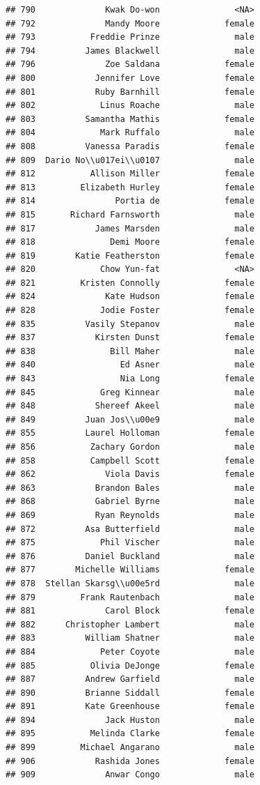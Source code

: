 \documentclass[
]{article}
\begin{document}
\begin{verbatim}
## 790              Kwak Do-won               <NA>
## 792              Mandy Moore             female
## 793           Freddie Prinze               male
## 794          James Blackwell               male
## 796              Zoe Saldana             female
## 800            Jennifer Love             female
## 801            Ruby Barnhill             female
## 802             Linus Roache               male
## 803          Samantha Mathis             female
## 804             Mark Ruffalo               male
## 808          Vanessa Paradis             female
## 809  Dario No\\u017ei\\u0107               male
## 812           Allison Miller             female
## 813         Elizabeth Hurley             female
## 814                Portia de             female
## 815       Richard Farnsworth               male
## 817            James Marsden               male
## 818               Demi Moore             female
## 819        Katie Featherston             female
## 820             Chow Yun-fat               <NA>
## 821         Kristen Connolly             female
## 824              Kate Hudson             female
## 828             Jodie Foster             female
## 835          Vasily Stepanov               male
## 837            Kirsten Dunst             female
## 838               Bill Maher               male
## 840                 Ed Asner               male
## 843                 Nia Long             female
## 845             Greg Kinnear               male
## 848            Shereef Akeel               male
## 849          Juan Jos\\u00e9               male
## 855          Laurel Holloman             female
## 856           Zachary Gordon               male
## 858           Campbell Scott             female
## 862              Viola Davis             female
## 863            Brandon Bales               male
## 868            Gabriel Byrne               male
## 869            Ryan Reynolds               male
## 872          Asa Butterfield               male
## 875             Phil Vischer               male
## 876          Daniel Buckland               male
## 877        Michelle Williams             female
## 878  Stellan Skarsg\\u00e5rd               male
## 879         Frank Rautenbach               male
## 881              Carol Block             female
## 882      Christopher Lambert               male
## 883          William Shatner               male
## 884             Peter Coyote               male
## 885           Olivia DeJonge             female
## 887          Andrew Garfield               male
## 890          Brianne Siddall             female
## 891          Kate Greenhouse             female
## 894              Jack Huston               male
## 895           Melinda Clarke             female
## 899         Michael Angarano               male
## 906            Rashida Jones             female
## 909              Anwar Congo               male
\end{verbatim}
\end{document}

